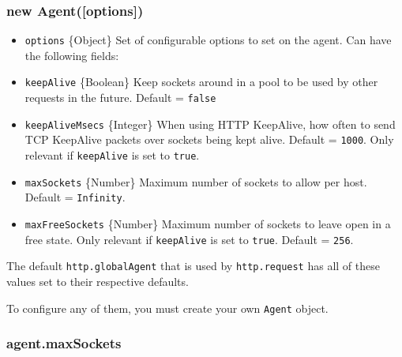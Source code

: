 \subsubsection{new Agent({[}options{]})}\label{new-agentoptions}

\begin{itemize}
\itemsep1pt\parskip0pt
\item
  \texttt{options} \{Object\} Set of configurable options to set on the
  agent. Can have the following fields:
\item
  \texttt{keepAlive} \{Boolean\} Keep sockets around in a pool to be
  used by other requests in the future. Default = \texttt{false}
\item
  \texttt{keepAliveMsecs} \{Integer\} When using HTTP KeepAlive, how
  often to send TCP KeepAlive packets over sockets being kept alive.
  Default = \texttt{1000}. Only relevant if \texttt{keepAlive} is set to
  \texttt{true}.
\item
  \texttt{maxSockets} \{Number\} Maximum number of sockets to allow per
  host. Default = \texttt{Infinity}.
\item
  \texttt{maxFreeSockets} \{Number\} Maximum number of sockets to leave
  open in a free state. Only relevant if \texttt{keepAlive} is set to
  \texttt{true}. Default = \texttt{256}.
\end{itemize}

The default \texttt{http.globalAgent} that is used by
\texttt{http.request} has all of these values set to their respective
defaults.

To configure any of them, you must create your own \texttt{Agent}
object.

\begin{Shaded}
\begin{Highlighting}[]
 \NormalTok{(}\NormalTok{);}
  \NormalTok{(\{ }\NormalTok{: } \NormalTok{\});}
 
\end{Highlighting}
\end{Shaded}

\subsubsection{agent.maxSockets}\label{agent.maxsockets}


